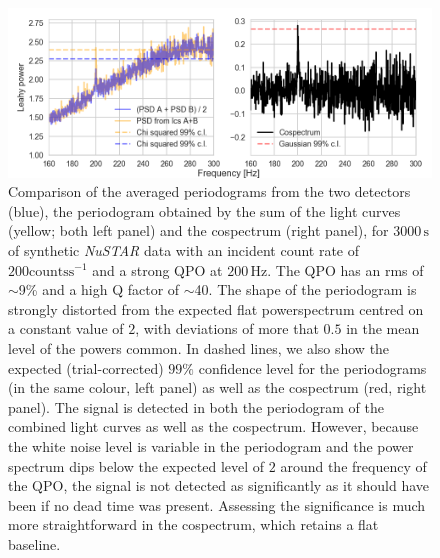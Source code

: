 \documentclass[12pt]{emulateapj}
\newcommand{\project}[1]{\textsl{#1}}
\newcommand{\nustar}{\project{NuSTAR}\xspace}
\begin{document}
\begin{figure}
\begin{center}
\includegraphics[width=\textwidth]{../figs/qpo.png}
\caption{Comparison of the averaged periodograms from the two detectors (blue), the periodogram obtained by the sum of the light curves (yellow; both left panel) and the cospectrum (right panel), for $3000\,\mathrm{s}$ of synthetic \nustar data with an incident count rate of $200 \mathrm{counts}\mathrm{s}^{-1}$ and a strong QPO at $200\,\mathrm{Hz}$. 
The QPO has an rms of $\sim$9\% and a high Q factor of $\sim$40. The shape of the periodogram is strongly distorted from the expected flat powerspectrum centred on a constant value of $2$, with deviations of more that $0.5$ in the mean level of the powers common. In dashed lines, we also show the expected (trial-corrected) $99\%$ confidence level for the periodograms (in the same colour, left panel) as well as the cospectrum (red, right panel). The signal is detected in both the periodogram of the combined light curves as well as the cospectrum. However, because the white noise level is variable in the periodogram and the power spectrum dips below the expected level of $2$ around the frequency of the QPO, the signal is not detected as significantly as it should have been if no dead time was present. Assessing the significance is much more straightforward in the cospectrum, which retains a flat baseline.
}
\label{fig:qpo}
\end{center}
\end{figure}
\end{document}
